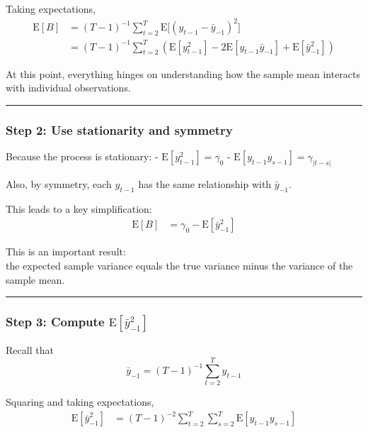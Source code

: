 \documentclass[11pt]{article}
\begin{document}
Taking expectations, \[
\begin{aligned}
\text{E}[B]
&= (T-1)^{-1}\sum_{t=2}^{T} \text{E}\big[(y_{t-1}-\bar y_{-1})^2\big]\\
&= (T-1)^{-1}\sum_{t=2}^{T} \left(\text{E}[y_{t-1}^2] - 2\text{E}[y_{t-1}\bar y_{-1}] + \text{E}[\bar y_{-1}^2]\right)
\end{aligned}
\]

At this point, everything hinges on understanding how the sample mean
interacts with individual observations.

\begin{center}\rule{0.5\linewidth}{0.5pt}\end{center}

\subsubsection{Step 2: Use stationarity and
symmetry}\label{step-2-use-stationarity-and-symmetry}

Because the process is stationary: - \(\text{E}[y_{t-1}^2] = \gamma_0\)
- \(\text{E}[y_{t-1}y_{s-1}] = \gamma_{|t-s|}\)

Also, by symmetry, each \(y_{t-1}\) has the same relationship with
\(\bar y_{-1}\).

This leads to a key simplification: \[
\begin{aligned}
\text{E}[B]
&= \gamma_0 - \text{E}[\bar y_{-1}^2]
\end{aligned}
\]

This is an important result:\\
the expected sample variance equals the true variance minus the variance
of the sample mean.

\begin{center}\rule{0.5\linewidth}{0.5pt}\end{center}

\subsubsection{\texorpdfstring{Step 3: Compute
\(\text{E}[\bar y_{-1}^2]\)}{Step 3: Compute \textbackslash text\{E\}{[}\textbackslash bar y\_\{-1\}\^{}2{]}}}\label{step-3-compute-textebar-y_-12}

Recall that \[
\bar y_{-1} = (T-1)^{-1}\sum_{t=2}^{T} y_{t-1}
\]

Squaring and taking expectations, \[
\begin{aligned}
\text{E}[\bar y_{-1}^2]
&= (T-1)^{-2}\sum_{t=2}^{T}\sum_{s=2}^{T} \text{E}[y_{t-1}y_{s-1}]
\end{aligned}
\]
\end{document}
